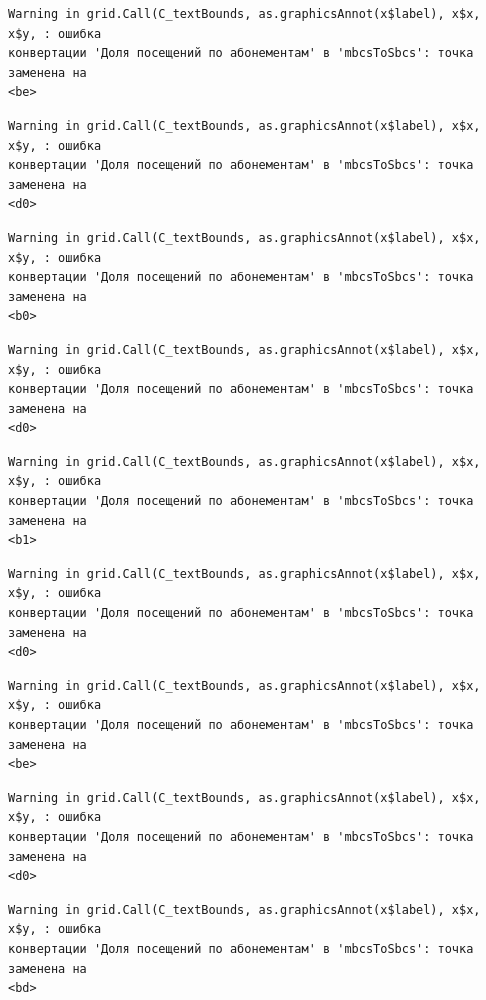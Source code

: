 \documentclass[
  letterpaper,
  DIV=11,
  numbers=noendperiod]{scrreprt}
\begin{document}
\begin{verbatim}
Warning in grid.Call(C_textBounds, as.graphicsAnnot(x$label), x$x, x$y, : ошибка
конвертации 'Доля посещений по абонементам' в 'mbcsToSbcs': точка заменена на
<be>
\end{verbatim}

\begin{verbatim}
Warning in grid.Call(C_textBounds, as.graphicsAnnot(x$label), x$x, x$y, : ошибка
конвертации 'Доля посещений по абонементам' в 'mbcsToSbcs': точка заменена на
<d0>
\end{verbatim}

\begin{verbatim}
Warning in grid.Call(C_textBounds, as.graphicsAnnot(x$label), x$x, x$y, : ошибка
конвертации 'Доля посещений по абонементам' в 'mbcsToSbcs': точка заменена на
<b0>
\end{verbatim}

\begin{verbatim}
Warning in grid.Call(C_textBounds, as.graphicsAnnot(x$label), x$x, x$y, : ошибка
конвертации 'Доля посещений по абонементам' в 'mbcsToSbcs': точка заменена на
<d0>
\end{verbatim}

\begin{verbatim}
Warning in grid.Call(C_textBounds, as.graphicsAnnot(x$label), x$x, x$y, : ошибка
конвертации 'Доля посещений по абонементам' в 'mbcsToSbcs': точка заменена на
<b1>
\end{verbatim}

\begin{verbatim}
Warning in grid.Call(C_textBounds, as.graphicsAnnot(x$label), x$x, x$y, : ошибка
конвертации 'Доля посещений по абонементам' в 'mbcsToSbcs': точка заменена на
<d0>
\end{verbatim}

\begin{verbatim}
Warning in grid.Call(C_textBounds, as.graphicsAnnot(x$label), x$x, x$y, : ошибка
конвертации 'Доля посещений по абонементам' в 'mbcsToSbcs': точка заменена на
<be>
\end{verbatim}

\begin{verbatim}
Warning in grid.Call(C_textBounds, as.graphicsAnnot(x$label), x$x, x$y, : ошибка
конвертации 'Доля посещений по абонементам' в 'mbcsToSbcs': точка заменена на
<d0>
\end{verbatim}

\begin{verbatim}
Warning in grid.Call(C_textBounds, as.graphicsAnnot(x$label), x$x, x$y, : ошибка
конвертации 'Доля посещений по абонементам' в 'mbcsToSbcs': точка заменена на
<bd>
\end{verbatim}
\end{document}
